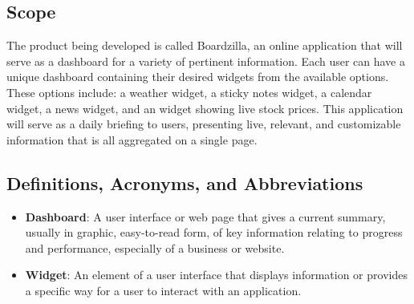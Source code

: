 \documentclass[]{article}
\begin{document}
	
	\subsection{Scope}
	\label{sub:scope}
	The product being developed is called Boardzilla, an online application that will serve as a dashboard for a variety of pertinent information. Each user can have a unique dashboard containing their desired widgets from the available options. These options include: a weather widget, a sticky notes widget, a calendar widget, a news widget, and an widget showing live stock prices. This application will serve as a daily briefing to users, presenting live, relevant, and customizable information that is all aggregated on a single page. 
	
	
	\subsection{Definitions, Acronyms, and Abbreviations}
	\label{sub:definitions_acronyms_and_abbreviations}
	\begin{itemize}
		\item \textbf{Dashboard}: A user interface or web page that gives a current summary, usually in graphic, easy-to-read form, of key information relating to progress and performance, especially of a business or website. %
		
		\item \textbf{Widget}: An element of a user interface that displays information or provides a specific way for a user to interact with an application. %
	\end{itemize}
	
\end{document}
